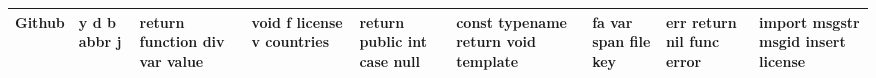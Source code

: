 \documentclass[11pt,a4paper]{article}
\begin{document}
\begin{appendices}
\begin{table*}[htp]
\begin{tiny}
\begin{tabular}{|p{}|p{}|p{}|p{}|p{}|p{}|p{}|p{}|p{}|}
Github & y \newline d \newline b \newline abbr \newline j & return \newline function \newline div \newline var \newline value & void \newline f \newline license \newline v \newline countries & return \newline public \newline int \newline case \newline null & const \newline typename \newline return \newline void \newline template & fa \newline var \newline span \newline file \newline key & err \newline return \newline nil \newline func \newline error & import \newline msgstr \newline msgid \newline insert \newline license\\\hline

\end{tabular}
\end{tiny}
\end{table*}
\end{appendices}
\end{document}
